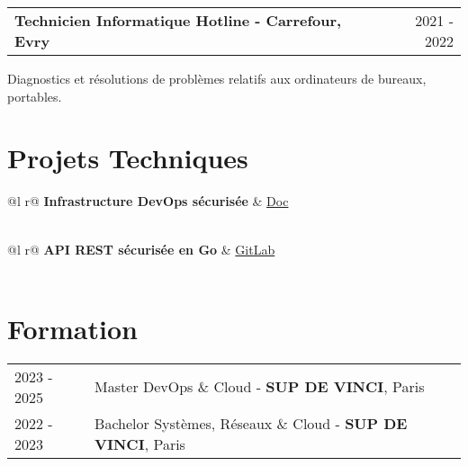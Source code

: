 \documentclass[a4paper,12pt]{article}
\makeatletter
\newenvironment{jobshort}[2]
    {
    \begin{tabularx}{\linewidth}{@{}l X r@{}}
    \textbf{#1} & \hfill &  #2 \\[3.75pt]
    \end{tabularx}
    }
    {
    }
\makeatother
\begin{document}
\begin{jobshort}{Technicien Informatique Hotline - Carrefour, Evry}{2021 - 2022}
Diagnostics et résolutions de problèmes relatifs aux ordinateurs de bureaux, portables.
\end{jobshort}

\section{Projets Techniques}

\begin{tabularx}{\linewidth}{ @{}l r@{} }
\textbf{Infrastructure DevOps sécurisée} & \hfill \href{https://drive.google.com/file/d/1PlXLjoWP856V7C8GVAYSbwkYGu0XzBrk/view}{Doc} \\[3.75pt]
  \\
\end{tabularx}

\begin{tabularx}{\linewidth}{ @{}l r@{} }
\textbf{API REST sécurisée en Go} & \hfill \href{https://gitlab.com/Rahman-S/api-certificats}{GitLab} \\[3.75pt]
  \\
\end{tabularx}

\section{Formation}
\begin{tabularx}{\linewidth}{@{}l X@{}}	
2023 - 2025 & Master DevOps \& Cloud - \textbf{SUP DE VINCI}, Paris \\
2022 - 2023 & Bachelor Systèmes, Réseaux \& Cloud - \textbf{SUP DE VINCI}, Paris \\ 
\end{tabularx}

\end{document}
